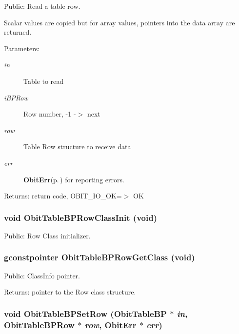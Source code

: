 Public: Read a table row. 

Scalar values are copied but for array values, pointers into the data array are returned. \begin{Desc}
\item[Parameters:]
\begin{description}
\item[{\em in}]Table to read \item[{\em i\-BPRow}]Row number, -1 -$>$ next \item[{\em row}]Table Row structure to receive data \item[{\em err}]{\bf Obit\-Err}{\rm (p.\,\pageref{structObitErr})} for reporting errors. \end{description}
\end{Desc}
\begin{Desc}
\item[Returns:]return code, OBIT\_\-IO\_\-OK=$>$ OK \end{Desc}
\subsubsection{\setlength{\rightskip}{0pt plus 5cm}void Obit\-Table\-BPRow\-Class\-Init (void)}\label{ObitTableBP_8h_a7}


Public: Row Class initializer. 

\subsubsection{\setlength{\rightskip}{0pt plus 5cm}gconstpointer Obit\-Table\-BPRow\-Get\-Class (void)}\label{ObitTableBP_8h_a9}


Public: Class\-Info pointer. 

\begin{Desc}
\item[Returns:]pointer to the Row class structure. \end{Desc}
\subsubsection{\setlength{\rightskip}{0pt plus 5cm}void Obit\-Table\-BPSet\-Row ({\bf Obit\-Table\-BP} $\ast$ {\em in}, {\bf Obit\-Table\-BPRow} $\ast$ {\em row}, {\bf Obit\-Err} $\ast$ {\em err})}\label{ObitTableBP_8h_a19}


